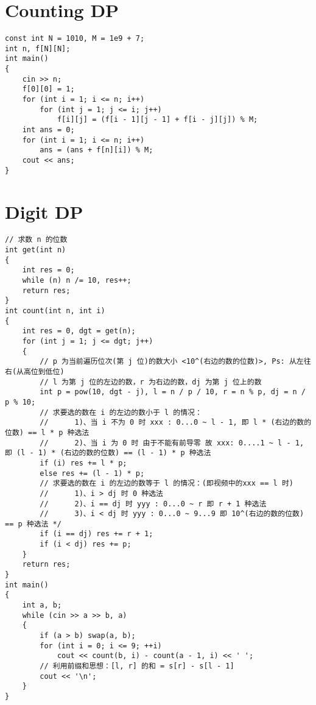 \section{Counting DP}
\begin{lstlisting}
const int N = 1010, M = 1e9 + 7;
int n, f[N][N];
int main()
{
    cin >> n;
    f[0][0] = 1;
    for (int i = 1; i <= n; i++)
        for (int j = 1; j <= i; j++)
            f[i][j] = (f[i - 1][j - 1] + f[i - j][j]) % M;
    int ans = 0;
    for (int i = 1; i <= n; i++)
        ans = (ans + f[n][i]) % M;
    cout << ans;
}
\end{lstlisting}
\section{Digit DP}
\begin{lstlisting}
// 求数 n 的位数
int get(int n)
{
    int res = 0;
    while (n) n /= 10, res++;
    return res;
}
int count(int n, int i)
{
    int res = 0, dgt = get(n);
    for (int j = 1; j <= dgt; j++)
    {
        // p 为当前遍历位次(第 j 位)的数大小 <10^(右边的数的位数)>, Ps: 从左往右(从高位到低位)
        // l 为第 j 位的左边的数，r 为右边的数，dj 为第 j 位上的数
        int p = pow(10, dgt - j), l = n / p / 10, r = n % p, dj = n / p % 10;
        // 求要选的数在 i 的左边的数小于 l 的情况：
        //      1)、当 i 不为 0 时 xxx : 0...0 ~ l - 1, 即 l * (右边的数的位数) == l * p 种选法
        //      2)、当 i 为 0 时 由于不能有前导零 故 xxx: 0....1 ~ l - 1, 即 (l - 1) * (右边的数的位数) == (l - 1) * p 种选法
        if (i) res += l * p;
        else res += (l - 1) * p;
        // 求要选的数在 i 的左边的数等于 l 的情况：(即视频中的xxx == l 时)
        //      1)、i > dj 时 0 种选法
        //      2)、i == dj 时 yyy : 0...0 ~ r 即 r + 1 种选法
        //      3)、i < dj 时 yyy : 0...0 ~ 9...9 即 10^(右边的数的位数) == p 种选法 */
        if (i == dj) res += r + 1;
        if (i < dj) res += p;
    }
    return res;
}
int main()
{
    int a, b;
    while (cin >> a >> b, a)
    {
        if (a > b) swap(a, b);
        for (int i = 0; i <= 9; ++i)
            cout << count(b, i) - count(a - 1, i) << ' ';
        // 利用前缀和思想：[l, r] 的和 = s[r] - s[l - 1]
        cout << '\n';
    }
}
\end{lstlisting}
